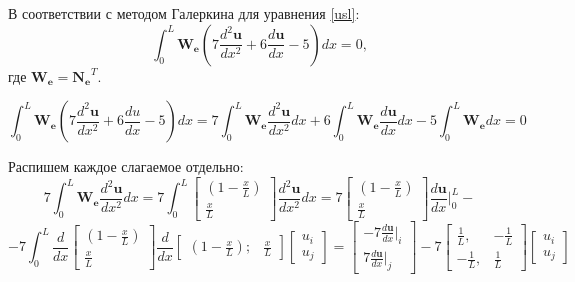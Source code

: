 В соответствии с методом Галеркина для уравнения \ref{usl}:
\begin{equation}\label{lin}
\int_0^L \mathbf{W_e}\left( 7\frac{d^2\mathbf{u}}{dx^2}  +6 \frac{d\mathbf{u}}{dx} -5  \right) d x=0,
\end{equation}
где $\mathbf{W_e=N_e}^T$.

$$\int_0^L \mathbf{W_e}\left(7\frac{d^2\mathbf{u}}{dx^2}  +6 \frac{du}{dx} -5  \right) d x= 7\int_0^L \mathbf{W_e} \frac{d^2 \mathbf{u}}{dx^2} dx   +6  \int_0^L \mathbf{W_e}\frac{d\mathbf{u}}{dx} d x  -5  \int_0^L \mathbf{W_e} d x=0$$

Распишем каждое слагаемое отдельно:
$$
7\int_0^L \mathbf{W_e} \frac{d^2 \mathbf{u}}{dx^2} dx=7\int_0^L
	\begin{bmatrix}
	(1-\frac{x}{L}) \\
	\frac{x}{L}
	\end{bmatrix}
\frac{d^2 \mathbf{u}}{dx^2} dx =
7
	\begin{bmatrix}
	(1-\frac{x}{L}) \\
	\frac{x}{L}
	\end{bmatrix}
\frac{d\mathbf{u}}{dx} |_0^L -
$$
$$
  -7  \int_0^L
\frac{d}{dx}
	\begin{bmatrix}
	(1-\frac{x}{L}) \\
	\frac{x}{L}
	\end{bmatrix}
\frac{d}{dx}
	\begin{bmatrix}
	(1-\frac{x}{L}); & \frac{x}{L}
	\end{bmatrix}
	\begin{bmatrix}
	u_i \\
	u_j
	\end{bmatrix}
=
	\begin{bmatrix}
	  -7 \frac{d\mathbf{u}}{dx}|_i \\
7\frac{d\mathbf{u}}{dx}|_j
	\end{bmatrix}   -7 
\begin{bmatrix}
\frac{1}{L}, & -\frac{1}{L} \\
-\frac{1}{L}, & \frac{1}{L}
\end{bmatrix}
\begin{bmatrix}
u_i \\
u_j
\end{bmatrix}
$$

